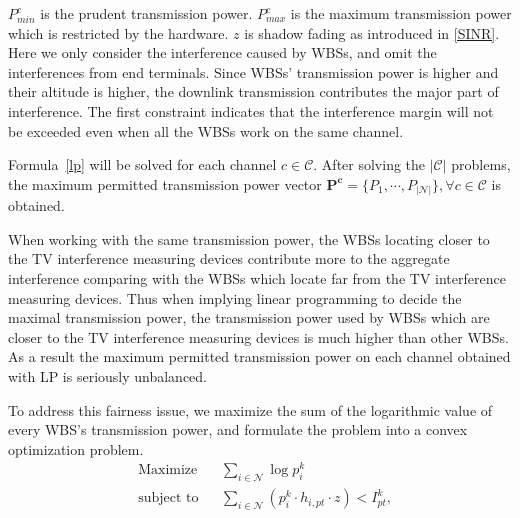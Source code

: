\documentclass[times]{ettauth}
\theoremstyle{mytheoremstyle}
\theoremstyle{mytheoremstyle}
\theoremstyle{mytheoremstyle}
\begin{document}

$P_{min}^c$ is the prudent transmission power. %
$P_{max}^c$ is the maximum transmission power which is restricted by the hardware.
$z$ is shadow fading as introduced in \ref{SINR}.
Here we only consider the interference caused by WBSs, and omit the interferences from end terminals. 
Since WBSs' transmission power is higher and their altitude is higher\cite{multipleIntf_pimrc11}, the downlink transmission contributes the major part of interference\cite{infmitigate07mobicom}.
The first constraint indicates that the interference margin will not be exceeded even when all the WBSs work on the same channel.


Formula~\ref{lp} will be solved for each channel $c\in \mathcal{C}$.
After solving the $|\mathcal{C}|$ problems, the maximum permitted transmission power vector $\bm{P^c} =\{P_1,\cdots,P_{|\mathcal{N}|}\}, \forall c\in \mathcal{C}$ is obtained.

When working with the same transmission power, the WBSs locating closer to the TV interference measuring devices contribute more to the aggregate interference comparing with the WBSs which locate far from the TV interference measuring devices.
Thus when implying linear programming to decide the maximal transmission power, the transmission power used by WBSs which are closer to the TV interference measuring devices is much higher than other WBSs.
As a result the maximum permitted transmission power on each channel obtained with LP is seriously unbalanced.

To address this fairness issue, we maximize the sum of the logarithmic value of every WBS's transmission power, and formulate the problem into a convex optimization problem.
	\begin{equation}
		\label{cvx}
		\begin{aligned}
		& {\text{Maximize}}
		& & \sum_{i\in \mathcal{N}} \log p^k_i \\
		& \text{subject to}
		& & \sum_{i\in \mathcal{N}} (p^k_i \cdot h_{i,pt}\cdot z) < I^k_{pt}, 
		\end{aligned}
	\end{equation}
\end{document}
